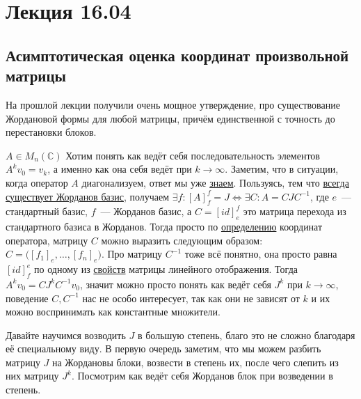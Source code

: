 \section{Лекция 16.04}
\subsection{Асимптотическая оценка координат произвольной матрицы}
\begin{motivation}
    На прошлой лекции получили очень мощное утверждение, про существование Жордановой формы
    для любой матрицы, причём единственной с точность до перестановки блоков.
\end{motivation}
$A \in M_n(\mathbb{C})$ Хотим понять как ведёт себя последовательность элементов
$A^k v_0 = v_k$, а именно как она себя ведёт при $k \to \infty$. Заметим, что
в ситуации, когда оператор $A$ диагонализуем, ответ мы уже 
\hyperref[stm:Ассимптотика диагонализуемого оператора]{знаем}. Пользуясь, тем что 
\hyperref[thm:О жордановом базисе]{всегда существует Жорданов базис}, получаем 
$\exists f\colon [A]^f_f = J \Leftrightarrow \exists C\colon A = C J C^{-1}$, где
$e$~--- стандартный базис, $f$~--- Жорданов базис, а
$C = [id]^f_e $ это матрица перехода из стандартного базиса в Жорданов. Тогда просто
по \hyperref[def:Матрица отображения]{определению} координат оператора, матрицу $C$ можно выразить следующим образом:
$C = \big( [f_1]_e, \dots, [f_n]_e \big)$. Про матрицу $C^{-1}$ тоже всё понятно, она
просто равна $[id]^e_f$ по одному из 
\hyperref[stm:О свойстве матриц линейных отображений]{свойств} матрицы линейного отображения.
Тогда $A^k v_0 = C J^k C^{-1} v_0$, значит можно просто понять как ведёт себя $J^k$ при
$k \to \infty$, поведение $C, C^{-1}$ нас не особо интересует, так как они не зависят от
$k$ и их можно воспринимать как константные множители.

Давайте научимся возводить $J$ в большую степень, благо это не сложно благодаря её 
специальному виду. В первую очередь заметим, что мы можем разбить матрицу $J$ на
Жордановы блоки, возвести в степень их, после чего слепить из них матрицу $J^k$.
Посмотрим как ведёт себя Жорданов блок при возведении в степень.

